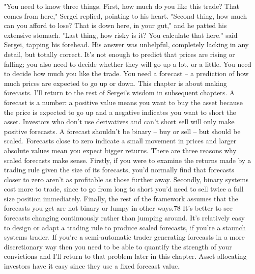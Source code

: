 \begin{englishblock} "You need to know three things. First, how much do you like this trade? That comes from here," Sergei replied, pointing to his heart. "Second thing, how much can you afford to lose? That is down here, in your gut," and he patted his extensive stomach. "Last thing, how risky is it? You calculate that here." said Sergei, tapping his forehead. His answer was unhelpful, completely lacking in any detail, but totally correct. It's not enough to predict that prices are rising or falling; you also need to decide whether they will go up a lot, or a little. You need to decide how much you like the trade. You need a forecast -- a prediction of how much prices are expected to go up or down. This chapter is about making forecasts. I'll return to the rest of Sergei's wisdom in subsequent chapters. A forecast is a number: a positive value means you want to buy the asset because the price is expected to go up and a negative indicates you want to short the asset. Investors who don't use derivatives and can't short sell will only make positive forecasts. A forecast shouldn't be binary -- buy or sell -- but should be scaled. Forecasts close to zero indicate a small movement in prices and larger absolute values mean you expect bigger returns. There are three reasons why scaled forecasts make sense. Firstly, if you were to examine the returns made by a trading rule given the size of its forecasts, you'd normally find that forecasts closer to zero aren't as profitable as those further away. Secondly, binary systems cost more to trade, since to go from long to short you'd need to sell twice a full size position immediately. Finally, the rest of the framework assumes that the forecasts you get are not binary or lumpy in other ways.78 It's better to see forecasts changing continuously rather than jumping around. It's relatively easy to design or adapt a trading rule to produce scaled forecasts, if you're a staunch systems trader. If you're a semi-automatic trader generating forecasts in a more discretionary way then you need to be able to quantify the strength of your convictions and I'll return to that problem later in this chapter. Asset allocating investors have it easy since they use a fixed forecast value. \end{englishblock}

